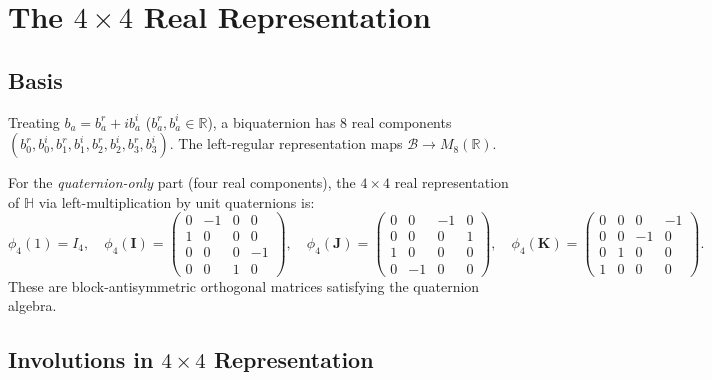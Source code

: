 \documentclass[12pt,a4paper]{article}
\theoremstyle{definition}
\theoremstyle{remark}
\begin{document}
\section{The $4\times4$ Real Representation}
\label{sec:mat:4x4}

\subsection{Basis}

Treating $b_a = b_a^r + ib_a^i$ ($b_a^r, b_a^i\in\mathbb{R}$),
a biquaternion has 8 real components
$(b_0^r, b_0^i, b_1^r, b_1^i, b_2^r, b_2^i, b_3^r, b_3^i)$.
The left-regular representation maps $\mathcal{B}\to M_8(\mathbb{R})$.

For the \emph{quaternion-only} part (four real components), the
$4\times4$ real representation of $\mathbb{H}$ via left-multiplication
by unit quaternions is:
\begin{equation}
  \phi_{4}(1) = I_4,
  \quad
  \phi_{4}(\mathbf{I}) = \begin{pmatrix}
    0 & -1 & 0 & 0 \\
    1 &  0 & 0 & 0 \\
    0 &  0 & 0 & -1 \\
    0 &  0 & 1 &  0
  \end{pmatrix},
  \quad
  \phi_{4}(\mathbf{J}) = \begin{pmatrix}
    0 & 0 & -1 & 0 \\
    0 & 0 &  0 & 1 \\
    1 & 0 &  0 & 0 \\
    0 & -1 & 0 & 0
  \end{pmatrix},
  \quad
  \phi_{4}(\mathbf{K}) = \begin{pmatrix}
    0 & 0 & 0 & -1 \\
    0 & 0 & -1 & 0 \\
    0 & 1 & 0 & 0 \\
    1 & 0 & 0 & 0
  \end{pmatrix}.
  \label{eq:mat:4x4_basis}
\end{equation}
These are block-antisymmetric orthogonal matrices satisfying the quaternion
algebra.

\subsection{Involutions in $4\times4$ Representation}
\end{document}
